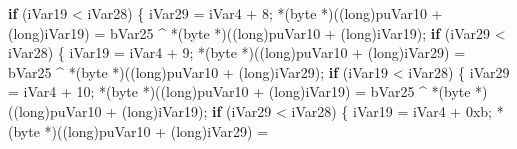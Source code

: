 \documentclass[
]{article}
\newenvironment{Shaded}{}{}
\newcommand{\BaseNTok}[1]{\textcolor[rgb]{0.25,0.63,0.44}{#1}}
\newcommand{\ControlFlowTok}[1]{\textcolor[rgb]{0.00,0.44,0.13}{\textbf{#1}}}
\newcommand{\DataTypeTok}[1]{\textcolor[rgb]{0.56,0.13,0.00}{#1}}
\newcommand{\DecValTok}[1]{\textcolor[rgb]{0.25,0.63,0.44}{#1}}
\newcommand{\NormalTok}[1]{#1}
\newcommand{\OperatorTok}[1]{\textcolor[rgb]{0.40,0.40,0.40}{#1}}
\begin{document}
\begin{Shaded}
\begin{Highlighting}[]
                \ControlFlowTok{if} \OperatorTok{(}\NormalTok{iVar19 }\OperatorTok{\textless{}}\NormalTok{ iVar28}\OperatorTok{)} \OperatorTok{\{}
\NormalTok{                  iVar29 }\OperatorTok{=}\NormalTok{ iVar4 }\OperatorTok{+} \DecValTok{8}\OperatorTok{;}
                  \OperatorTok{*(}\NormalTok{byte }\OperatorTok{*)((}\DataTypeTok{long}\OperatorTok{)}\NormalTok{puVar10 }\OperatorTok{+} \OperatorTok{(}\DataTypeTok{long}\OperatorTok{)}\NormalTok{iVar19}\OperatorTok{)} \OperatorTok{=}
\NormalTok{                       bVar25 }\OperatorTok{\^{}} \OperatorTok{*(}\NormalTok{byte }\OperatorTok{*)((}\DataTypeTok{long}\OperatorTok{)}\NormalTok{puVar10 }\OperatorTok{+} \OperatorTok{(}\DataTypeTok{long}\OperatorTok{)}\NormalTok{iVar19}\OperatorTok{);}
                  \ControlFlowTok{if} \OperatorTok{(}\NormalTok{iVar29 }\OperatorTok{\textless{}}\NormalTok{ iVar28}\OperatorTok{)} \OperatorTok{\{}
\NormalTok{                    iVar19 }\OperatorTok{=}\NormalTok{ iVar4 }\OperatorTok{+} \DecValTok{9}\OperatorTok{;}
                    \OperatorTok{*(}\NormalTok{byte }\OperatorTok{*)((}\DataTypeTok{long}\OperatorTok{)}\NormalTok{puVar10 }\OperatorTok{+} \OperatorTok{(}\DataTypeTok{long}\OperatorTok{)}\NormalTok{iVar29}\OperatorTok{)} \OperatorTok{=}
\NormalTok{                         bVar25 }\OperatorTok{\^{}} \OperatorTok{*(}\NormalTok{byte }\OperatorTok{*)((}\DataTypeTok{long}\OperatorTok{)}\NormalTok{puVar10 }\OperatorTok{+} \OperatorTok{(}\DataTypeTok{long}\OperatorTok{)}\NormalTok{iVar29}\OperatorTok{);}
                    \ControlFlowTok{if} \OperatorTok{(}\NormalTok{iVar19 }\OperatorTok{\textless{}}\NormalTok{ iVar28}\OperatorTok{)} \OperatorTok{\{}
\NormalTok{                      iVar29 }\OperatorTok{=}\NormalTok{ iVar4 }\OperatorTok{+} \DecValTok{10}\OperatorTok{;}
                      \OperatorTok{*(}\NormalTok{byte }\OperatorTok{*)((}\DataTypeTok{long}\OperatorTok{)}\NormalTok{puVar10 }\OperatorTok{+} \OperatorTok{(}\DataTypeTok{long}\OperatorTok{)}\NormalTok{iVar19}\OperatorTok{)} \OperatorTok{=}
\NormalTok{                           bVar25 }\OperatorTok{\^{}} \OperatorTok{*(}\NormalTok{byte }\OperatorTok{*)((}\DataTypeTok{long}\OperatorTok{)}\NormalTok{puVar10 }\OperatorTok{+} \OperatorTok{(}\DataTypeTok{long}\OperatorTok{)}\NormalTok{iVar19}\OperatorTok{);}
                      \ControlFlowTok{if} \OperatorTok{(}\NormalTok{iVar29 }\OperatorTok{\textless{}}\NormalTok{ iVar28}\OperatorTok{)} \OperatorTok{\{}
\NormalTok{                        iVar19 }\OperatorTok{=}\NormalTok{ iVar4 }\OperatorTok{+} \BaseNTok{0xb}\OperatorTok{;}
                        \OperatorTok{*(}\NormalTok{byte }\OperatorTok{*)((}\DataTypeTok{long}\OperatorTok{)}\NormalTok{puVar10 }\OperatorTok{+} \OperatorTok{(}\DataTypeTok{long}\OperatorTok{)}\NormalTok{iVar29}\OperatorTok{)} \OperatorTok{=}

\end{Highlighting}
\end{Shaded}
\end{document}
